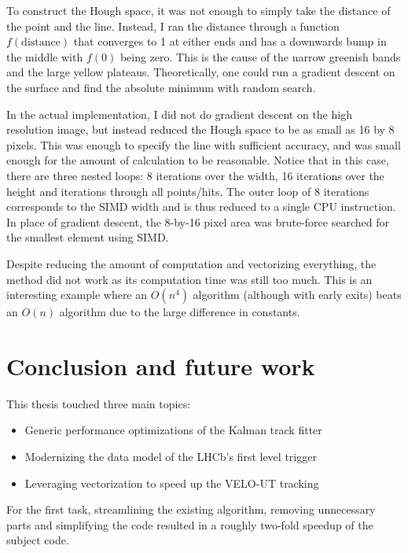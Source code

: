 \documentclass[12pt]{article}
\begin{document}
To construct the Hough space, it was not enough to simply take the distance of the point and the line. Instead, I ran the distance through a function $f(\text{distance})$ that converges to 1 at either ends and has a downwards bump in the middle with $f(0)$ being zero. This is the cause of the narrow greenish bands and the large yellow plateaus. Theoretically, one could run a gradient descent on the surface and find the absolute minimum with random search.
\vspace{1pc}

In the actual implementation, I did not do gradient descent on the high resolution image, but instead reduced the Hough space to be as small as 16 by 8 pixels. This was enough to specify the line with sufficient accuracy, and was small enough for the amount of calculation to be reasonable. Notice that in this case, there are three nested loops: 8 iterations over the width, 16 iterations over the height and iterations through all points/hits. The outer loop of 8 iterations corresponds to the SIMD width and is thus reduced to a single CPU instruction. In place of gradient descent, the 8-by-16 pixel area was brute-force searched for the smallest element using SIMD.
\vspace{1pc}

Despite reducing the amount of computation and vectorizing everything, the method did not work as its computation time was still too much. This is an interesting example where an $O(n^4)$ algorithm (although with early exits) beats an $O(n)$ algorithm due to the large difference in constants.


\newpage
\section{Conclusion and future work}

This thesis touched three main topics:
\begin{itemize}
	\item Generic performance optimizations of the Kalman track fitter
	\item Modernizing the data model of the LHCb's first level trigger
	\item Leveraging vectorization to speed up the VELO-UT tracking
\end{itemize}
For the first task, streamlining the existing algorithm, removing unnecessary parts and simplifying the code resulted in a roughly two-fold speedup of the subject code.
\end{document}
